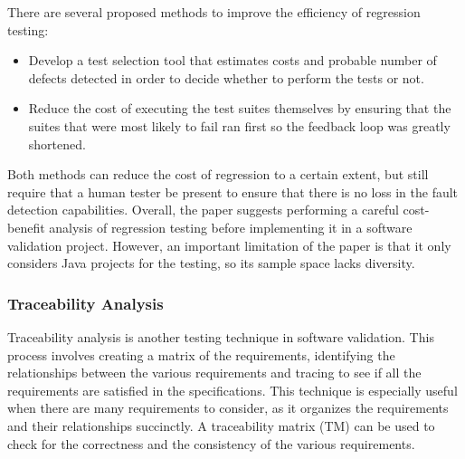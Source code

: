 \documentclass[journal, onecolumn]{IEEEtran}
\begin{document}
	There are several proposed methods to improve the efficiency of regression testing:
	
	\begin{itemize}
		\item  Develop a test selection tool that estimates costs and probable number of defects detected in order to decide whether to perform the tests or not. 
		\item Reduce the cost of executing the test suites themselves by ensuring that the suites that were most likely to fail ran first so the feedback loop was greatly shortened. \cite{rosenblum}
	\end{itemize}
	
	Both methods can reduce the cost of regression to a certain extent, but still require that a human tester be present to ensure that there is no loss in the fault detection capabilities. 
	\newline \newline
	Overall, the paper suggests performing a careful cost-benefit analysis of regression testing before implementing it in a software validation project. However, an important limitation of the paper is that it only considers Java projects for the testing, so its sample space lacks diversity.
	
	\bigskip
	
	\subsubsection{Traceability Analysis}
	
	Traceability analysis is another testing technique in software validation. This process involves creating a matrix of the requirements, identifying the relationships between the various requirements and tracing to see if all the requirements are satisfied in the specifications. This technique is especially useful when there are many requirements to consider, as it organizes the requirements and their relationships succinctly. A traceability matrix (TM) can be used to check for the correctness and the consistency of the various requirements.
	
\end{document}
